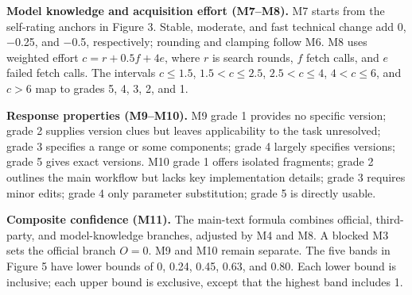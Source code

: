 \documentclass[manuscript,review,anonymous]{acmart}
\begin{document}
\textbf{Model knowledge and acquisition effort (M7--M8).} M7 starts from the self-rating anchors in Figure 3. Stable, moderate, and fast technical change add 0, −0.25, and −0.5, respectively; rounding and clamping follow M6. M8 uses weighted effort \(c=r+0.5f+4e\), where \(r\) is search rounds, \(f\) fetch calls, and \(e\) failed fetch calls. The intervals \(c\leq 1.5\), \(1.5<c\leq 2.5\), \(2.5<c\leq 4\), \(4<c\leq 6\), and \(c>6\) map to grades 5, 4, 3, 2, and 1.

\textbf{Response properties (M9--M10).} M9 grade 1 provides no specific version; grade 2 supplies version clues but leaves applicability to the task unresolved; grade 3 specifies a range or some components; grade 4 largely specifies versions; grade 5 gives exact versions. M10 grade 1 offers isolated fragments; grade 2 outlines the main workflow but lacks key implementation details; grade 3 requires minor edits; grade 4 only parameter substitution; grade 5 is directly usable.

\textbf{Composite confidence (M11).} The main-text formula combines official, third-party, and model-knowledge branches, adjusted by M4 and M8. A blocked M3 sets the official branch \(O=0\). M9 and M10 remain separate. The five bands in Figure 5 have lower bounds of 0, 0.24, 0.45, 0.63, and 0.80. Each lower bound is inclusive; each upper bound is exclusive, except that the highest band includes 1.


\end{document}
